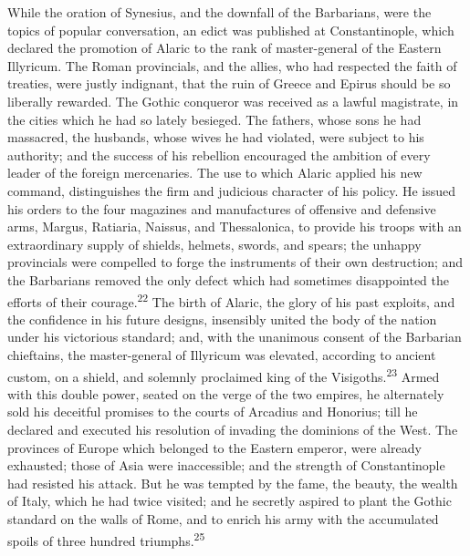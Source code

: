 While the oration of Synesius, and the downfall of the
Barbarians, were the topics of popular conversation, an edict was
published at Constantinople, which declared the promotion of
Alaric to the rank of master-general of the Eastern Illyricum.
The Roman provincials, and the allies, who had respected the
faith of treaties, were justly indignant, that the ruin of Greece
and Epirus should be so liberally rewarded. The Gothic conqueror
was received as a lawful magistrate, in the cities which he had
so lately besieged. The fathers, whose sons he had massacred, the
husbands, whose wives he had violated, were subject to his
authority; and the success of his rebellion encouraged the
ambition of every leader of the foreign mercenaries. The use to
which Alaric applied his new command, distinguishes the firm and
judicious character of his policy. He issued his orders to the
four magazines and manufactures of offensive and defensive arms,
Margus, Ratiaria, Naissus, and Thessalonica, to provide his
troops with an extraordinary supply of shields, helmets, swords,
and spears; the unhappy provincials were compelled to forge the
instruments of their own destruction; and the Barbarians removed
the only defect which had sometimes disappointed the efforts of
their courage.\textsuperscript{22} The birth of Alaric, the glory of his past
exploits, and the confidence in his future designs, insensibly
united the body of the nation under his victorious standard; and,
with the unanimous consent of the Barbarian chieftains, the
master-general of Illyricum was elevated, according to ancient
custom, on a shield, and solemnly proclaimed king of the
Visigoths.\textsuperscript{23} Armed with this double power, seated on the verge
of the two empires, he alternately sold his deceitful promises to
the courts of Arcadius and Honorius; till he declared and
executed his resolution of invading the dominions of the West.
The provinces of Europe which belonged to the Eastern emperor,
were already exhausted; those of Asia were inaccessible; and the
strength of Constantinople had resisted his attack. But he was
tempted by the fame, the beauty, the wealth of Italy, which he
had twice visited; and he secretly aspired to plant the Gothic
standard on the walls of Rome, and to enrich his army with the
accumulated spoils of three hundred triumphs.\textsuperscript{25}


